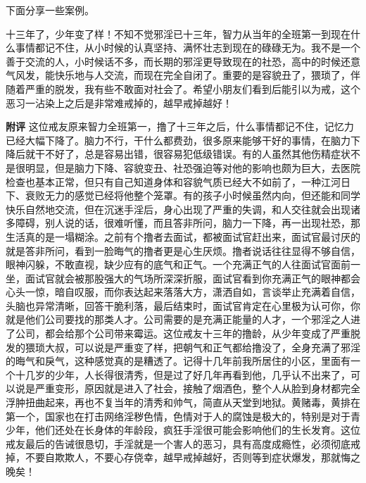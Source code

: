 下面分享一些案例。

\begin{case}
    十三年了，少年变了样！不知不觉邪淫已十三年，智力从当年的全班第一到现在什么事情都记不住，从小时候的认真坚持、满怀壮志到现在的碌碌无为。我不是一个善于交流的人，小时候话不多，而长期的邪淫更导致现在的社恐，高中的时候还意气风发，能快乐地与人交流，而现在完全自闭了。重要的是容貌丑了，猥琐了，伴随着严重的脱发，我有些不敢面对社会了。希望小朋友们看到后能引以为戒，这个恶习一沾染上之后是非常难戒掉的，越早戒掉越好！

    \textbf{附评} 这位戒友原来智力全班第一，撸了十三年之后，什么事情都记不住，记忆力已经大幅下降了。脑力不行，干什么都费劲，很多原来能够干好的事情，在脑力下降后就干不好了，总是容易出错，很容易犯低级错误。有的人虽然其他伤精症状不是很明显，但是脑力下降、容貌变丑、社恐强迫等对他的影响也颇为巨大，去医院检查也基本正常，但只有自己知道身体和容貌气质已经大不如前了，一种江河日下、衰败无力的感觉已经将他整个笼罩。有的孩子小时候虽然内向，但还能和同学快乐自然地交流，但在沉迷手淫后，身心出现了严重的失调，和人交往就会出现诸多障碍，别人说的话，很难听懂，而且答非所问，脑力一下降，再一出现社恐，那生活真的是一塌糊涂。之前有个撸者去面试，都被面试官赶出来，面试官最讨厌的就是答非所问，看到一脸晦气的撸者更是心生厌烦。撸者说话往往显得不够自信，眼神闪躲，不敢直视，缺少应有的底气和正气。一个充满正气的人往面试官面前一坐，面试官就会被那股强大的气场所深深折服，面试官看到你充满正气的眼神都会心头一惊，暗自叹服，而你表达起来落落大方，潇洒自如，言谈举止充满着自信，头脑也异常清晰，回答干脆利落，最后结束时，面试官肯定在心里极为认可你，你就是他们公司要找的那类人才。公司需要的是充满正能量的人才，一个邪淫之人进了公司，都会给那个公司带来霉运。这位戒友十三年的撸龄，从少年变成了严重脱发的猥琐大叔，可以说是严重变了样，把朝气和正气都给撸没了，全身充满了邪淫的晦气和戾气，这种感觉真的是糟透了。记得十几年前我所居住的小区，里面有一个十几岁的少年，人长得很清秀，但是过了好几年再看到他，几乎认不出来了，可以说是严重变形，原因就是进入了社会，接触了烟酒色，整个人从脸到身材都完全浮肿扭曲起来，再也不复当年的清秀和帅气，简直从天堂到地狱。黄赌毒，黄排在第一个，国家也在打击网络淫秽色情，色情对于人的腐蚀是极大的，特别是对于青少年，他们还处在长身体的年龄段，疯狂手淫很可能会影响他们的生长发育。这位戒友最后的告诫很恳切，手淫就是一个害人的恶习，具有高度成瘾性，必须彻底戒掉，不要自欺欺人，不要心存侥幸，越早戒掉越好，否则等到症状爆发，那就悔之晚矣！
\end{case}

